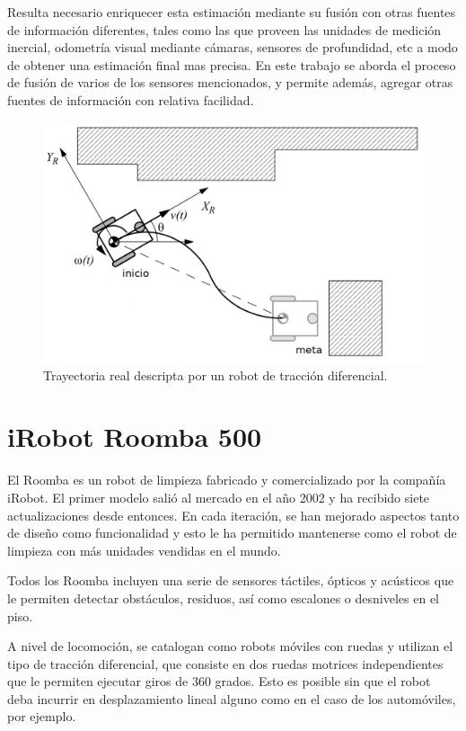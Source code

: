 Resulta necesario enriquecer esta estimación mediante su fusión con otras fuentes de información diferentes, tales como las que proveen las unidades de medición inercial, odometría visual mediante cámaras, sensores de profundidad, etc a modo de obtener una estimación final mas precisa. En este trabajo se aborda el proceso de fusión de varios de los sensores mencionados, y permite además, agregar otras fuentes de información con relativa facilidad.

\begin{figure}[ht]
    \centering
    \includegraphics[scale=0.8]{./Figures/navigation.png}
    \caption{Trayectoria real descripta por un robot de tracción diferencial.}
    \label{fig:navigation}
\end{figure}

\section{iRobot Roomba 500}\label{sec:roomba}

El Roomba es un robot de limpieza fabricado y comercializado por la compañía iRobot. El primer modelo salió al mercado en el año 2002 y ha recibido siete actualizaciones desde entonces. En cada iteración, se han mejorado aspectos tanto de diseño como funcionalidad y esto le ha permitido mantenerse como el robot de limpieza con más unidades vendidas en el mundo.

Todos los Roomba incluyen una serie de sensores táctiles, ópticos y acústicos que le permiten detectar obstáculos, residuos, así como escalones o desniveles en el piso.

A nivel de locomoción, se catalogan como robots móviles con ruedas y utilizan el tipo de tracción diferencial, que consiste en dos ruedas motrices independientes que le permiten ejecutar giros de 360 grados. Esto es posible sin que el robot deba incurrir en desplazamiento lineal alguno como en el caso de los automóviles, por ejemplo.


